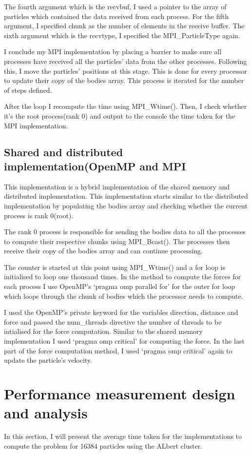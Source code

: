 \documentclass[12pt]{IEEEtran}
\begin{document}
The fourth argument which is the recvbuf, I used a pointer to the array of particles which contained the data received from each process. For the fifth argument, I specified chunk as the number of elements in the receive buffer. The sixth argument which is the recvtype, I specified the MPI\_ParticleType again.
\medskip

I conclude my MPI implementation by placing a barrier to make sure all processes have received all the particles' data from the other processes. Following this, I move the particles' positions at this stage. This is done for every processor to update their copy of the bodies array. This process is iterated for the number of steps defined.
\medskip

After the loop I recompute the time using MPI\_Wtime(). Then, I check whether it's the root process(rank 0) and output to the console the time taken for the MPI implementation.

\subsection{Shared and distributed implementation(OpenMP and MPI}
This implementation is a hybrid implementation of the shared memory and distributed implementation. This implementation starts similar to the distributed implementation by populating the bodies array and checking whether the current process is rank 0(root).
\medskip

The rank 0 process is responsible for sending the bodies data to all the processes to compute their respective chunks using MPI\_Bcast(). The processes then receive their copy of the bodies array and can continue processing.
\medskip

The counter is started at this point using MPI\_Wtime() and a for loop is initialised to loop one thousand times. In the method to compute the forces for each process I use OpenMP's `pragma omp parallel for' for the outer for loop which loops through the chunk of bodies which the processor needs to compute. 
\medskip

I used the OpenMP's private keyword for the variables direction, distance and force and passed the num\_threads directive the number of threads to be intialised for the force computation. Similar to the shared memory implementation I used `pragma omp critical' for computing the force. In the last part of the force computation method, I used `pragma omp critical' again to update the particle's velocity.

\section{Performance measurement design and analysis}
In this section, I will present the average time taken for the implementations to compute the problem for 16384 particles using the ALbert cluster.
 
\end{document}
